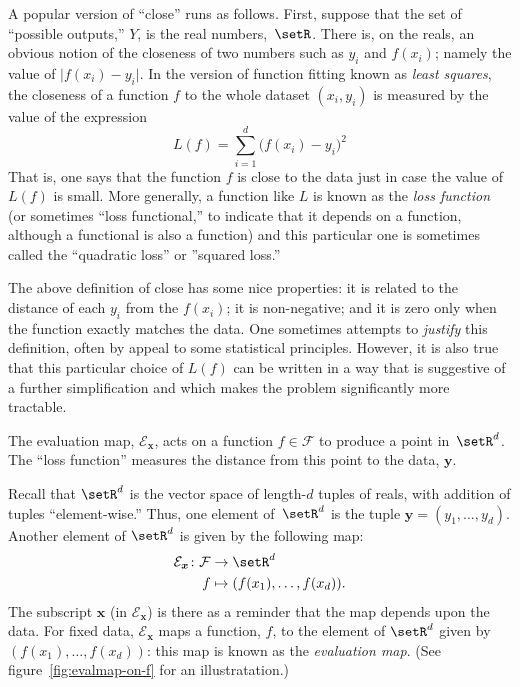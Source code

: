 \documentclass[10pt, a4paper]{article}
\begin{document}
A popular version of “close” runs as follows. First, suppose that the
set of “possible outputs,” $Y$, is the real
numbers,~$\setR$. There is, on the reals, an obvious
notion of the closeness of two numbers such as $y_i$ and $f(x_i)$;
namely the value of $\lvert f(x_i)-y_i\rvert$. In the version of
function fitting known as \emph{least squares}, the closeness of a
function $f$ to the whole dataset $(x_i, y_i)$ is measured by the
value of the expression
\begin{equation}
  \label{eq:least-squares-loss}
  L(f) = \sum_{i=1}^d {\bigl(f(x_i)-y_i\bigr)}^2  
\end{equation}
That is, one says that the function $f$ is close to the data just in
case the value of $L(f)$ is small. More generally, a function like $L$
is known as the \emph{loss function} (or sometimes “loss functional,”
to indicate that it depends on a function, although a functional is
also a function) and this particular one is sometimes called the
“quadratic loss” or ”squared loss.”

The above definition of close has some nice properties: it is related
to the distance of each $y_i$ from the $f(x_i)$; it is non-negative;
and it is zero only when the function exactly matches the data. One
sometimes attempts to \emph{justify} this definition, often by appeal
to some statistical principles. However, it is also true that this
particular choice of $L(f)$ can be written in a way that is suggestive
of a further simplification and which makes the problem significantly
more tractable. 

\begin{marginfigure}
  \begin{center}
  \end{center}
  \caption{The evaluation map, $\mathcal{E}_{\bm{x}}$, acts on a function
    $f\in\mathcal{F}$ to produce a point in~$\setR^d$. The “loss function”
    measures the distance from this point to the data, 
    $\bm{y}$.\label{fig:evalmap-on-f}}
\end{marginfigure}
Recall that $\setR^d$ is the vector space of length-$d$ tuples of
reals, with addition of tuples “element-wise.” Thus, one element
of~$\setR^d$ is the tuple $\bm{y}=(y_1,\dotsc,y_d)$. Another element
of $\setR^d$ is given by the following map:
\[
  \begin{aligned}
    \mathcal{E}_{\bm{x}} \colon \mathcal{F} &\to \setR^d \\
    f &\mapsto (f(x_1), \dotsc, f(x_d)).
  \end{aligned}
\]
The subscript $\bm{x}$ (in $\mathcal{E}_{\bm{x}}$) is there as a reminder that
the map depends upon the data. For fixed data, $\mathcal{E}_{\bm{x}}$ maps a
function, $f$, to the element of $\setR^d$ given by
$(f(x_1), \dotsc, f(x_d))$: this map is known as the \emph{evaluation
  map}. (See figure~\ref{fig:evalmap-on-f} for an illustratation.)
\end{document}
